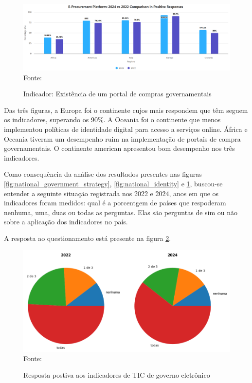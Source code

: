 \begin{figure}[H]
	\centering
	\caption{Indicador: Existência de um portal de compras governamentais}
	\includegraphics[width=1\linewidth]{figuras/ict_in_government/procurement_portal}
	\label{fig:procurement_portal}
	\footnotesize{Fonte: \cite{ONU_ICT_in_government_indicators}}
\end{figure}

Das três figuras, a Europa foi o continente cujos mais respondem que têm seguem os indicadores, superando os 90\%. A Oceania foi o continente que menos implementou políticas de identidade digital para acesso a serviços online. África e Oceania tiveram um desempenho ruim na implementação de portais de compra governamentais. O continente american apresentou bom desempenho nos três indicadores.

Como consequência da análise dos resultados presentes nas figuras \ref{fig:national_government_strategy}, \ref{fig:national_identity} e \ref{fig:procurement_portal}, buscou-se entender a seguinte situação registrada nos 2022 e 2024, anos em que os indicadores foram medidos: qual é a porcentgem de países que respoderam nenhuma, uma, duas ou todas as perguntas. Elas são perguntas de sim ou não sobre a aplicação dos indicadores no país.

A resposta ao questionamento está presente na figura \ref{fig:indicators_answer}.

\begin{figure}[H]
	\centering
	\caption{Resposta postiva aos indicadores de TIC de governo eletrônico}
	\includegraphics[width=1\linewidth]{figuras/ict_in_government/indicators_answer}
	\label{fig:indicators_answer}
	\footnotesize{Fonte: \cite{ONU_ICT_in_government_indicators}}
\end{figure}

